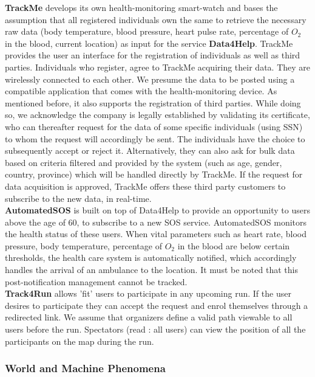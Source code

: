 \documentclass[12pt]{article}
\begin{document}
\textbf{TrackMe} develops its own health-monitoring smart-watch and bases the assumption that all registered individuals own the same to retrieve the necessary raw data (body temperature, blood pressure, heart pulse rate, percentage of $O_2$ in the blood, current location)  as input for the service \textbf{Data4Help}. TrackMe provides the user an interface for the registration of individuals as well as third parties. Individuals who register, agree to TrackMe acquiring their data. They are wirelessly connected to each other. We presume the data to be posted using a compatible application that comes with the health-monitoring device. As mentioned before, it also supports the registration of third parties. While doing so, we acknowledge the company is legally established by validating its certificate, who can thereafter request for the data of some specific individuals (using SSN) to whom the request will accordingly be sent. The individuals have the choice to subsequently accept or reject it. Alternatively, they can also ask for bulk data based on criteria filtered and provided by the system (such as age, gender, country, province) which will be handled directly by TrackMe. If the request for data acquisition is approved, TrackMe offers these third party customers to subscribe to the new data, in real-time.\\
\textbf{AutomatedSOS} is built on top of Data4Help to provide an opportunity to users above the age of 60, to subscribe to a new SOS service. AutomatedSOS monitors the health status of these users. When vital parameters  such as heart rate, blood pressure, body temperature, percentage of $O_2$ in the blood are below certain thresholds, the health care system is automatically notified, which accordingly handles the arrival of an ambulance to the location. It must be noted that this post-notification management cannot be tracked.\\

\textbf{Track4Run} allows 'fit' users to participate in any upcoming run. If the user desires to participate they can accept the request and enrol themselves through a redirected link.  We assume that organizers define a valid path viewable to all users before the run. Spectators (read : all users) can view the position of all the participants on the map during the run. \\

\subsubsection{World and Machine Phenomena}
\end{document}
